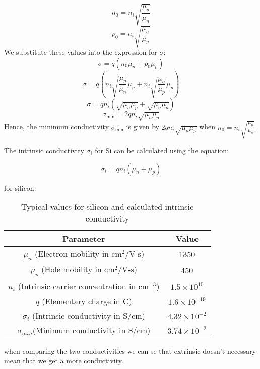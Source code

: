 \begin{equation*}
n_0 = n_i \sqrt{\frac{\mu_p}{\mu_n}}
\end{equation*}
\begin{equation*}
p_0 = n_i \sqrt{\frac{\mu_n}{\mu_p}}
\end{equation*}
We substitute these values into the expression for $ \sigma $:
\begin{equation*}
\sigma = q(n_0 \mu_n + p_0 \mu_p)
\end{equation*}
\begin{equation*}
\sigma = q(n_i \sqrt{\frac{\mu_p}{\mu_n}} \mu_n + n_i \sqrt{\frac{\mu_n}{\mu_p}} \mu_p)
\end{equation*}
\begin{equation*}
\sigma = q n_i (\sqrt{\mu_n \mu_p} + \sqrt{\mu_n \mu_p})
\end{equation*}
\begin{equation*}
\sigma_{\text{min}} = 2 q n_i \sqrt{\mu_n \mu_p}
\end{equation*}
Hence, the minimum conductivity $ \sigma_{\text{min}} $ is given by $ 2 q n_i \sqrt{\mu_n \mu_p} $ when $ n_0 = n_i \sqrt{\frac{\mu_p}{\mu_n}} $.

The intrinsic conductivity $\sigma_i$ for Si can be calculated using the equation:

\begin{equation*}
    \sigma_i = qn_i(\mu_n+\mu_p)
\end{equation*}

for silicon:

\begin{table}[H]
    \centering
    \begin{tabular}{cc}
    \hline
    Parameter & Value \\
    \hline
    \( \mu_n \) (Electron mobility in \(\text{cm}^2/\text{V-s}\)) & 1350 \\
    \( \mu_p \) (Hole mobility in \(\text{cm}^2/\text{V-s}\)) & 450 \\
    \( n_i \) (Intrinsic carrier concentration in \(\text{cm}^{-3}\)) & \(1.5 \times 10^{10}\) \\
    \( q \) (Elementary charge in C) & \(1.6 \times 10^{-19}\) \\
    \hline
    \( \sigma_i \) (Intrinsic conductivity in \(\text{S/cm}\)) & \(4.32 \times 10^{-2}\) \\
    $\sigma_{min}$(Minimum conductivity in \(\text{S/cm}\)) & $3.74 \times 10^{-2}$\\
    \hline
    \end{tabular}
    \caption{Typical values for silicon and calculated intrinsic conductivity}
\end{table}

when comparing the two conductivities we can se that extrinsic doesn't necessary mean that we get a more conductivity.  
